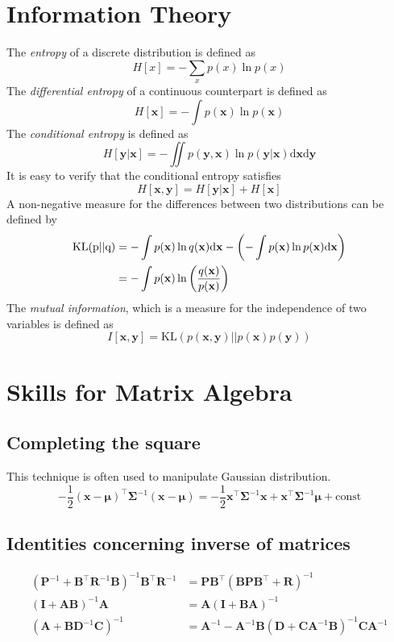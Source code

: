 \documentclass[a4paper]{book}
\newcommand{\ud}{\mathrm{d}}
\renewcommand{\bf}{\mathbf}
\newcommand{\imp}[1]{\textit{#1}}
\newcommand{\bs}{\boldsymbol}
\begin{document}
\section{Information Theory}
The \imp{entropy} of a discrete distribution is defined as
\begin{equation}
	H[x] = -\sum_x p(x) \ln p(x)
\end{equation}
The \imp{differential entropy} of a continuous counterpart is defined as
\begin{equation}
	H[\bf{x}]=-\int p(\bf{x})\ln p(\bf{x})
\end{equation}
The \imp{conditional entropy} is defined as
\begin{equation}
	H[\bf{y}|\bf{x}] = -\iint p(\bf{y},\bf{x}) \ln p(\bf{y}|\bf{x}) \ud \bf{x} \ud \bf{y}
\end{equation}
It is easy to verify that the conditional entropy satisfies
\begin{equation}
	H[\bf{x},\bf{y}] = H[\bf{y}|\bf{x}] + H[\bf{x}]
\end{equation} 
A non-negative measure for the differences between two distributions can be defined by
\begin{align}
\rm{KL}(p||q)&=	-\int p(\bf{x}) \ln q(\bf{x}) \ud \bf{x} - \left(-\int p(\bf{x})\ln p(\bf{x})\ud \bf{x}\right)\notag \\
&= -\int p(\bf{x}) \ln \left(\frac{q(\bf{x})}{p(\bf{x})}\right)
\end{align}
The \imp{mutual information}, which is a measure for the independence of two variables is defined as
\begin{equation}
	I[\bf{x},\bf{y}] = \mathrm{KL}(p(\bf{x},\bf{y})||p(\bf{x})p(\bf{y}))
\end{equation}
\section{Skills for Matrix Algebra}
\subsection{Completing the square}
This technique is often used to manipulate Gaussian distribution.
\begin{equation}
	-\frac{1}{2}(\bf{x}-\bs{\mu})^{\intercal}\bs{\Sigma}^{-1}(\bf{x}-\bs{\mu})=-\frac{1}{2}\bf{x}^{\intercal}\bs{\Sigma}^{-1}\bf{x}+\bf{x}^{\intercal}\bs{\Sigma}^{-1}\bs{\mu}+\text{const}
\end{equation}
\subsection{Identities concerning inverse of matrices}
\begin{align}
	(\bf{P}^{-1}+\bf{B}^{\intercal}\bf{R}^{-1}\bf{B})^{-1}\bf{B}^{\intercal}\bf{R}^{-1}&=\bf{PB}^{\intercal}(\bf{BPB}^{\intercal}+\bf{R})^{-1} \label{ide0}\\
	(\bf{I+AB})^{-1}\bf{A} &= \bf{A}(\bf{I+BA})^{-1}\\
	(\bf{A+B}\bf{D}^{-1}\bf{C})^{-1} &= \bf{A}^{-1}-\bf{A}^{-1}\bf{B}(\bf{D}+\bf{CA}^{-1}\bf{B})^{-1}\bf{CA}^{-1} \label{ide1}
\end{align}
\end{document}

